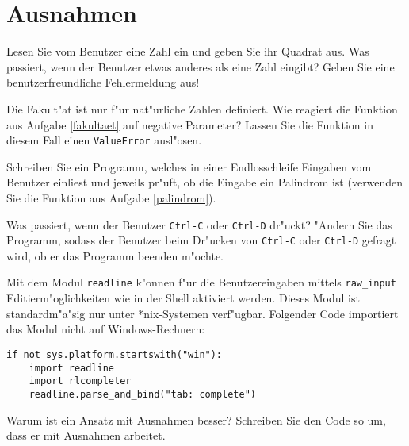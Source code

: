 \section*{Ausnahmen}
\begin{aufgabe}
Lesen Sie vom Benutzer eine Zahl ein und geben Sie ihr Quadrat aus. Was passiert, wenn der Benutzer etwas anderes als eine Zahl eingibt? Geben Sie eine benutzerfreundliche Fehlermeldung aus!
\end{aufgabe}

\begin{aufgabe}
Die Fakult"at ist nur f"ur nat"urliche Zahlen definiert. Wie reagiert die Funktion aus Aufgabe \ref{fakultaet} auf negative Parameter? Lassen Sie die Funktion in diesem Fall einen \texttt{ValueError} ausl"osen.
\end{aufgabe}

\begin{aufgabe}Schreiben Sie ein Programm, welches in einer Endlosschleife Eingaben vom Benutzer einliest und jeweils pr"uft, ob die Eingabe ein Palindrom ist (verwenden Sie die Funktion aus Aufgabe \ref{palindrom}). 

Was passiert, wenn der Benutzer \texttt{Ctrl-C} oder \texttt{Ctrl-D} dr"uckt? "Andern Sie das Programm, sodass der Benutzer beim Dr"ucken von \texttt{Ctrl-C} oder \texttt{Ctrl-D} gefragt wird, ob er das Programm beenden m"ochte.
\end{aufgabe}

\begin{aufgabe}
Mit dem Modul \texttt{readline} k"onnen f"ur die Benutzereingaben mittels \texttt{raw\_input} Editierm"oglichkeiten wie in der Shell aktiviert werden. Dieses Modul ist standardm"a"sig nur unter *nix-Systemen verf"ugbar. Folgender Code importiert das Modul nicht auf Windows-Rechnern:
\begin{lstlisting}
if not sys.platform.startswith("win"):
    import readline
    import rlcompleter
    readline.parse_and_bind("tab: complete")
\end{lstlisting}
Warum ist ein Ansatz mit Ausnahmen besser? Schreiben Sie den Code so um, dass er mit Ausnahmen arbeitet.
\end{aufgabe}

